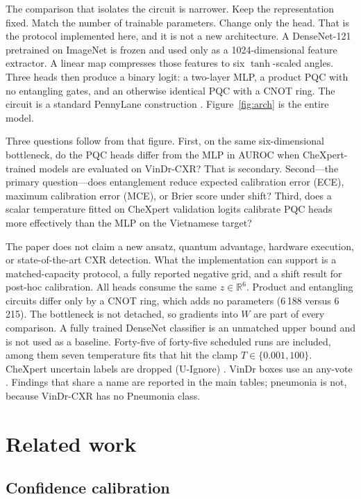 \documentclass{midl} %
\begin{document}
The comparison that isolates the circuit is narrower. Keep the representation fixed. Match the number of trainable parameters. Change only the head. That is the protocol implemented here, and it is not a new architecture. A DenseNet-121 \cite{huang2017densenet} pretrained on ImageNet \cite{deng2009imagenet} is frozen and used only as a 1024-dimensional feature extractor. A linear map compresses those features to six $\tanh$-scaled angles. Three heads then produce a binary logit: a two-layer MLP, a product PQC with no entangling gates, and an otherwise identical PQC with a CNOT ring. The circuit is a standard PennyLane construction \cite{bergholm2018pennylane}. Figure~\ref{fig:arch} is the entire model.

Three questions follow from that figure. First, on the same six-dimensional bottleneck, do the PQC heads differ from the MLP in AUROC when CheXpert-trained models are evaluated on VinDr-CXR? That is secondary. Second---the primary question---does entanglement reduce expected calibration error (ECE), maximum calibration error (MCE), or Brier score under shift? Third, does a scalar temperature fitted on CheXpert validation logits \cite{guo2017calibration} calibrate PQC heads more effectively than the MLP on the Vietnamese target?

The paper does not claim a new ansatz, quantum advantage, hardware execution, or state-of-the-art CXR detection. What the implementation can support is a matched-capacity protocol, a fully reported negative grid, and a shift result for post-hoc calibration. All heads consume the same $z\in\mathbb{R}^{6}$. Product and entangling circuits differ only by a CNOT ring, which adds no parameters (6\,188 versus 6\,215). The bottleneck is not detached, so gradients into $W$ are part of every comparison. A fully trained DenseNet classifier is an unmatched upper bound and is not used as a baseline. Forty-five of forty-five scheduled runs are included, among them seven temperature fits that hit the clamp $T\in\{0.001,100\}$. CheXpert uncertain labels are dropped (U-Ignore) \cite{irvin2019chexpert}. VinDr boxes use an any-vote \cite{nguyen2022vindrcxr}. Findings that share a name are reported in the main tables; pneumonia is not, because VinDr-CXR has no Pneumonia class.

\section{Related work}

\subsection{Confidence calibration}
\end{document}
